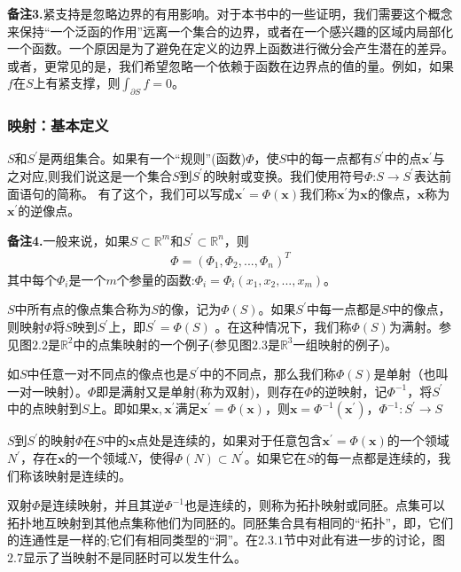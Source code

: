 \textbf{备注3.}紧支持是忽略边界的有用影响。对于本书中的一些证明，我们需要这个概念来保持“一个泛函的作用”远离一个集合的边界，或者在一个感兴趣的区域内局部化一个函数。一个原因是为了避免在定义的边界上函数进行微分会产生潜在的差异。或者，更常见的是，我们希望忽略一个依赖于函数在边界点的值的量。例如，如果$f$在$S$上有紧支撑，则$\int _{\partial S}f=0$。

\subsubsection{映射：基本定义}
$S$和$S^{'}$是两组集合。如果有一个“规则”(函数)$\Phi$，使$S$中的每一点都有$S^{'}$中的点$\mathbf{x}^{'}$与之对应,则我们说这是一个集合$S$到$S^{'}$的映射或变换。我们使用符号$\Phi$:$S\rightarrow S^{'}$表达前面语句的简称。
有了这个，我们可以写成$\mathbf{x}^{'}=\Phi (\mathbf{x})$我们称$\mathbf{x}^{'}$为$\mathbf{x}$的像点，$\mathbf{x}$称为$\mathbf{x}^{'}$的逆像点。

\textbf{备注4.}一般来说，如果$S\subset \mathbb{R}^m$和$S^{'}\subset \mathbb{R}^n$，则
\begin{gather}
\Phi =(\Phi _1,\Phi _2,...,\Phi_n)^T
\end{gather}
其中每个$\Phi _i$是一个$m$个参量的函数:$\Phi _i = \Phi _i(x_1,x_2,...,x_m)$。

$S$中所有点的像点集合称为$S$的像，记为$\Phi (S)$。如果$S^{'}$中每一点都是$S$中的像点，则映射$\Phi$将$S$映到$S^{'}$上，即$S^{'}=\Phi (S)$
。在这种情况下，我们称$\Phi (S)$为满射。参见图$2.2$是$\mathbb{R}^2$中的点集映射的一个例子(参见图$2.3$是$\mathbb{R}^3$一组映射的例子)。

如$S$中任意一对不同点的像点也是$S^{'}$中的不同点，那么我们称$\Phi (S)$是单射（也叫一对一映射）。$\Phi$即是满射又是单射(称为双射)，则存在$\Phi$的逆映射，记$\Phi ^{-1}$，将$S^{'}$中的点映射到$S$上。即如果$\mathbf{x},\mathbf{x}^{'}$满足$\mathbf{x}^{'}= \Phi (\mathbf{x})$，则$\mathbf{x}=\Phi ^{-1} (\mathbf{x}^{'})$，$\Phi ^{-1} :S^{'}\rightarrow S$

$S$到$S^{'}$的映射$\Phi$在$S$中的$\mathbf{x}$点处是连续的，如果对于任意包含$\mathbf{x}^{'}= \Phi (\mathbf{x})$的一个领域$N^{'}$，存在$\mathbf{x}$的一个领域$N$，使得$\Phi (N)\subset N^{'}$。如果它在$S$的每一点都是连续的，我们称该映射是连续的。

双射$\Phi$是连续映射，并且其逆$\Phi^{-1}$也是连续的，则称为拓扑映射或同胚。点集可以拓扑地互映射到其他点集称他们为同胚的。同胚集合具有相同的“拓扑”，即，它们的连通性是一样的;它们有相同类型的“洞”。在$2.3.1$节中对此有进一步的讨论，图$2.7$显示了当映射不是同胚时可以发生什么。

